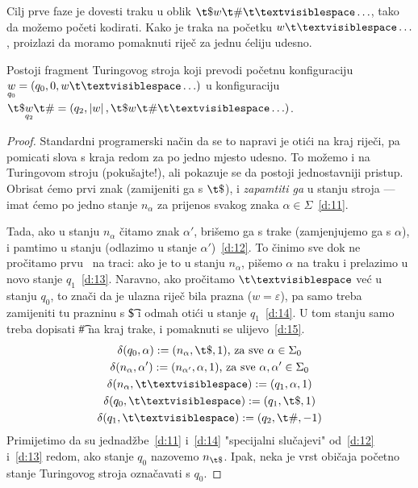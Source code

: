 Cilj prve faze je dovesti traku u oblik $\t\$w\t\#\bl\ldots$, tako da možemo početi kodirati. Kako je traka na početku $w\bl\ldots$, proizlazi da moramo pomaknuti riječ za jednu ćeliju udesno.

\begin{lema}\label{lm:faza1}
Postoji fragment Turingovog stroja koji prevodi početnu konfiguraciju $\underset{q_0}{w}=(q_0,0,w\bl\ldots)$ u konfiguraciju $\t\$\underset{q_2}{w}\t\#=(q_2,\left|w\right|,\t\$w\t\#\bl\ldots)$.
\end{lema}
\begin{proof}
Standardni programerski način da se to napravi je otići na kraj riječi, pa pomicati slova s kraja redom za po jedno mjesto udesno. To možemo i na Turingovom stroju (pokušajte!), ali pokazuje se da postoji jednostavniji pristup. Obrisat ćemo prvi znak (zamijeniti ga s $\t\$$), i \emph{zapamtiti ga} u stanju stroja --- imat ćemo po jedno stanje $n_\alpha$ za prijenos svakog znaka $\alpha\in\Sigma$~\eqref{d:11}.

Tada, ako u stanju $n_\alpha$ čitamo znak $\alpha'$, brišemo ga s trake (zamjenjujemo ga s $\alpha$), i pamtimo u stanju (odlazimo u stanje $\alpha'$)~\eqref{d:12}. To činimo sve dok ne pročitamo prvu \bl\ na traci: ako je to u stanju $n_\alpha$, pišemo $\alpha$ na traku i prelazimo u novo stanje $q_1$~\eqref{d:13}. Naravno, ako pročitamo $\bl$ već u stanju $q_0$, to znači da je ulazna riječ bila prazna ($w=\varepsilon$), pa samo treba zamijeniti tu prazninu s \t\$ i odmah otići u stanje $q_1$~\eqref{d:14}. U tom stanju samo treba dopisati \t\# na kraj trake, i pomaknuti se ulijevo~\eqref{d:15}. 
\begin{gather}
\label{d:11}
    \delta(q_0,\alpha):=(n_\alpha,\t\$,1)\text{, za sve }\alpha\in\Sigma_0\\
\label{d:12}
    \delta(n_\alpha,\alpha'):=(n_{\alpha'},\alpha,1)\text{, za sve }\alpha,\alpha'\in\Sigma_0\\
\label{d:13}
    \delta(n_\alpha,\bl):=(q_1,\alpha,1)\\
\label{d:14}
    \delta(q_0,\bl):=(q_1,\t\$,1)\\
\label{d:15}
    \delta(q_1,\bl):=(q_2,\t\#,-1)
\end{gather}
Primijetimo da su jednadžbe~\eqref{d:11} i~\eqref{d:14} "specijalni slučajevi" od~\eqref{d:12} i~\eqref{d:13} redom, ako stanje $q_0$ nazovemo $n_{\t\$}$. Ipak, neka je vrst običaja početno stanje Turingovog stroja označavati s $q_0$.
\end{proof}


